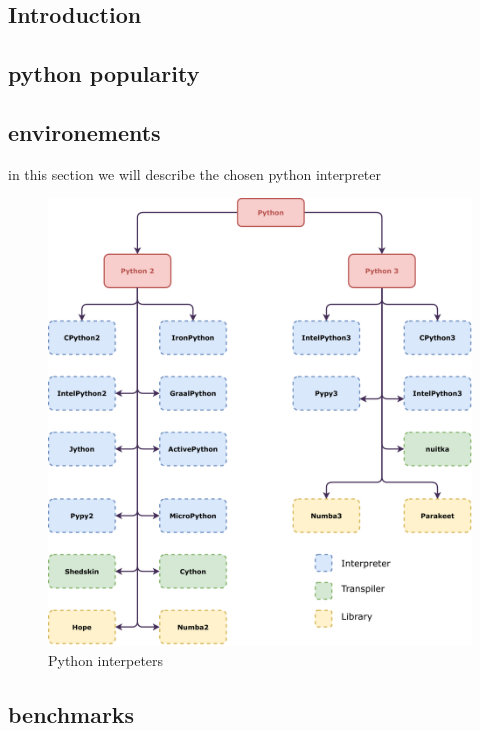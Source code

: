 \subsection{Introduction}

\subsection{python popularity}



\subsection{environements}
in this section we will describe the chosen python interpreter


\begin{figure}[thb]
    \centering
    \includegraphics[width=\linewidth]{imgs/python-implementations-tree}
    \caption{Python interpeters}
    \label{fig:interpreters}
\end{figure}

\subsection{benchmarks}

